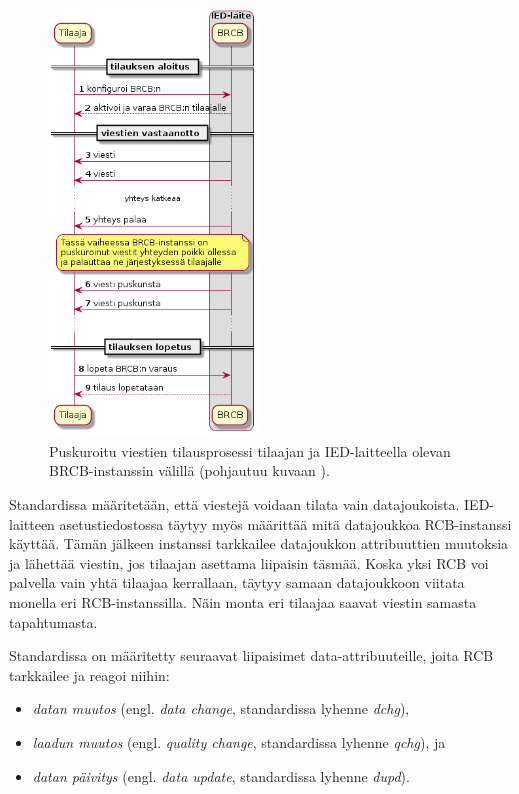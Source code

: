 \begin{figure}[ht!]
	\includegraphics[width=0.5\textwidth]{pictures/iec61850-brcb-communication.png}
	\caption{Puskuroitu viestien tilausprosessi tilaajan ja IED-laitteella olevan BRCB-instanssin välillä (pohjautuu kuvaan \mbox{\cite[s.~42]{IEC61850-7-1}}).}
	\label{fig:iec61850-brcb-communication}
\end{figure}

Standardissa määritetään, että viestejä voidaan tilata vain datajoukoista. IED-laitteen asetustiedostossa täytyy myös määrittää mitä datajoukkoa RCB-instanssi käyttää. Tämän jälkeen instanssi tarkkailee datajoukkon attribuuttien muutoksia ja lähettää viestin, jos tilaajan asettama liipaisin täsmää. Koska yksi RCB voi palvella vain yhtä tilaajaa kerrallaan, täytyy samaan datajoukkoon viitata monella eri RCB-instanssilla. Näin monta eri tilaajaa saavat viestin samasta tapahtumasta. \mbox{\cite[s.~93]{IEC61850-7-2}}

Standardissa on määritetty seuraavat liipaisimet data-attribuuteille, joita RCB tarkkailee ja reagoi niihin:
\begin{itemize}
	\item \emph{datan muutos} (engl. \emph{data change}, standardissa lyhenne \emph{dchg}),
	\item \emph{laadun muutos} (engl. \emph{quality change}, standardissa lyhenne \emph{qchg}), ja
	\item \emph{datan päivitys} (engl. \emph{data update}, standardissa lyhenne \emph{dupd}).
\end{itemize}

